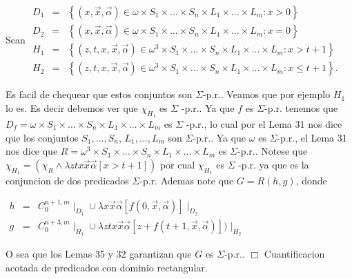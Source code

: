 Sean
\(\displaystyle \begin{array}{rcl} D_{1} & =& \left\{ (x,\vec{x},\vec{\alpha})\in \omega \times S_{1}\times ...\times S_{n}\times L_{1}\times ...\times L_{m}:x >0\right\} \\ D_{2} & =& \left\{ (x,\vec{x},\vec{\alpha})\in \omega \times S_{1}\times ...\times S_{n}\times L_{1}\times ...\times L_{m}:x=0\right\} \\ H_{1} & =& \left\{ (z,t,x,\vec{x},\vec{\alpha})\in \omega ^{3}\times S_{1}\times ...\times S_{n}\times L_{1}\times ...\times L_{m}:x >t+1\right\} \\ H_{2} & =& \left\{ (z,t,x,\vec{x},\vec{\alpha})\in \omega ^{3}\times S_{1}\times ...\times S_{n}\times L_{1}\times ...\times L_{m}:x\leq t+1\right\} . \end{array} \)

Es facil de chequear que estos conjuntos son \(\Sigma \)-p.r.. Veamos que por ejemplo \(H_{1}\) lo es. Es decir debemos ver que \(\chi _{H_{1}}\) es \(\Sigma \) -p.r.. Ya que \(f\) es \(\Sigma \)-p.r. tenemos que \(D_{f}=\omega \times S_{1}\times ...\times S_{n}\times L_{1}\times ...\times L_{m}\) es \(\Sigma \) -p.r., lo cual por el Lema 31 nos dice que los conjuntos \( S_{1},...,S_{n}\), \(L_{1},...,L_{m}\) son \(\Sigma \)-p.r.. Ya que \(\omega \) es \( \Sigma \)-p.r., el Lema 31 nos dice que \(R=\omega ^{3}\times S_{1}\times ...\times S_{n}\times L_{1}\times ...\times L_{m}\) es \(\Sigma \)-p.r.. Notese que \(\chi _{H_{1}}=(\chi _{R}\wedge \lambda ztx\vec{x} \vec{\alpha}\left[ x >t+1\right] )\) por cual \(\chi _{H_{1}}\) es \(\Sigma \) -p.r. ya que es la conjuncion de dos predicados \(\Sigma \)-p.r.
Ademas note que \(G=R(h,g)\), donde

\(\displaystyle \begin{array}{rcl} h & =& C_{0}^{n+1,m}\mid _{D_{1}}\cup \lambda x\vec{x}\vec{\alpha}\left[ f(0, \vec{x},\vec{\alpha})\right] \mid _{D_{2}} \\ g & =& C_{0}^{n+3,m}\mid _{H_{1}}\cup \lambda ztx\vec{x}\vec{\alpha}\left[ z+f(t+1,\vec{x},\vec{\alpha})\right] )\mid _{H_{2}} \end{array} \)

O sea que los Lemas 35 y 32 garantizan que \(G\) es \( \Sigma \)-p.r.. \(\Box\)
Cuantificacion acotada de predicados con dominio rectangular.


